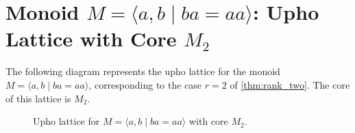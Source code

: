 \documentclass{article}
\begin{document}
\section*{Monoid $M = \langle a, b \mid ba = aa \rangle$: Upho Lattice with Core $M_2$}

The following diagram represents the upho lattice for the monoid $M = \langle a, b \mid ba = aa \rangle$, corresponding to the case $r=2$ of \cref{thm:rank_two}. The core of this lattice is $M_2$.

\begin{figure}[h]
\centering
{}
\caption{Upho lattice for $M = \langle a, b \mid ba = aa \rangle$ with core $M_2$.}
\label{fig:upho_lattice}
\end{figure}
\end{document}
